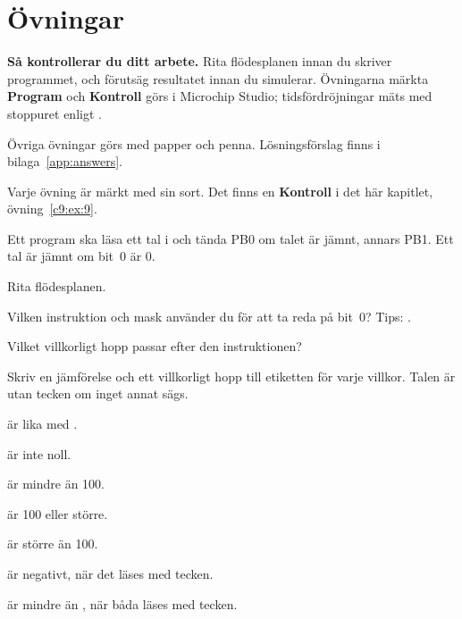 
\section{Övningar}
\label{c9:sec:exercises}\label{c9:app:c}

\begin{aside}
\textbf{Så kontrollerar du ditt arbete.} Rita flödesplanen innan du skriver programmet, och
förutsäg resultatet innan du simulerar. Övningarna märkta \textbf{Program} och \textbf{Kontroll}
görs i Microchip Studio; tidsfördröjningar mäts med stoppuret enligt .

Övriga övningar görs med papper och penna. Lösningsförslag finns i bilaga~\ref{app:answers}.

Varje övning är märkt med sin sort. Det finns en \textbf{Kontroll} i det här kapitlet,
övning~\ref{c9:ex:9}.
\end{aside}

\label{c9:ex:1}
Ett program ska läsa ett tal i  och tända PB0 om talet är jämnt, annars PB1. Ett tal är
jämnt om bit~0 är 0.
\begin{parts}
  \item Rita flödesplanen.
  \item Vilken instruktion och mask använder du för att ta reda på bit~0? Tips: .
  \item Vilket villkorligt hopp passar efter den instruktionen?
\end{parts}

\label{c9:ex:2}
Skriv en jämförelse och ett villkorligt hopp till etiketten  för varje villkor. Talen är
utan tecken om inget annat sägs.
\begin{parts}
  \item {} är lika med .
  \item {} är inte noll.
  \item {} är mindre än 100.
  \item {} är 100 eller större.
  \item {} är större än 100.
  \item {} är negativt, när det läses med tecken.
  \item {} är mindre än , när båda läses med tecken.
\end{parts}

